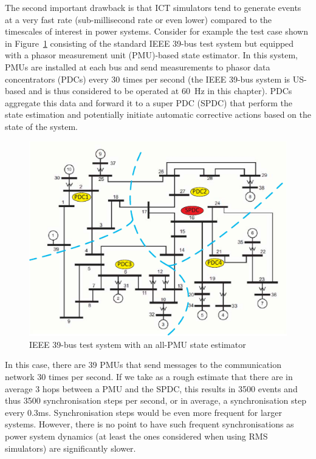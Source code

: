 The second important drawback is that ICT simulators tend to generate events at a very fast rate (sub-millisecond rate or even lower) compared to the timescales of interest in power systems. Consider for example the test case shown in Figure~\ref{fig:IEEE_PMU} consisting of the standard IEEE 39-bus test system but equipped with a phasor measurement unit (PMU)-based state estimator. In this system, PMUs are installed at each bus and send measurements to phasor data concentrators (PDCs) every 30 times per second (the IEEE 39-bus system is US-based and is thus considered to be operated at 60~Hz in this chapter). PDCs aggregate this data and forward it to a super PDC (SPDC) that perform the state estimation and potentially initiate automatic corrective actions based on the state of the system.

\begin{figure}
\centering
\includegraphics[width=0.6\linewidth]{Figs/IEEE39-PMU.pdf}
\caption{IEEE 39-bus test system with an all-PMU state estimator~\cite{GECOtestcase}}
\label{fig:IEEE_PMU}
\end{figure}

In this case, there are 39 PMUs that send messages to the communication network 30 times per second. If we take as a rough estimate that there are in average 3 hops between a PMU and the SPDC, this results in 3500 events and thus 3500 synchronisation steps per second, or in average, a synchronisation step every 0.3ms. Synchronisation steps would be even more frequent for larger systems. However, there is no point to have such frequent synchronisations as power system dynamics (at least the ones considered when using RMS simulators) are significantly slower.

